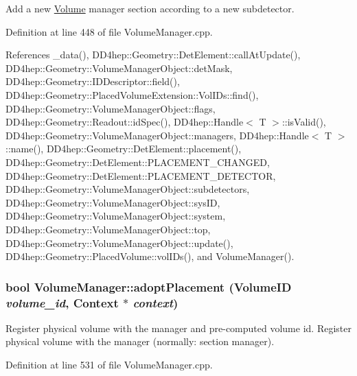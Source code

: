 Add a new \hyperlink{class_d_d4hep_1_1_geometry_1_1_volume}{Volume} manager section according to a new subdetector. 

Definition at line 448 of file VolumeManager.cpp.

References \_\-data(), DD4hep::Geometry::DetElement::callAtUpdate(), DD4hep::Geometry::VolumeManagerObject::detMask, DD4hep::Geometry::IDDescriptor::field(), DD4hep::Geometry::PlacedVolumeExtension::VolIDs::find(), DD4hep::Geometry::VolumeManagerObject::flags, DD4hep::Geometry::Readout::idSpec(), DD4hep::Handle$<$ T $>$::isValid(), DD4hep::Geometry::VolumeManagerObject::managers, DD4hep::Handle$<$ T $>$::name(), DD4hep::Geometry::DetElement::placement(), DD4hep::Geometry::DetElement::PLACEMENT\_\-CHANGED, DD4hep::Geometry::DetElement::PLACEMENT\_\-DETECTOR, DD4hep::Geometry::VolumeManagerObject::subdetectors, DD4hep::Geometry::VolumeManagerObject::sysID, DD4hep::Geometry::VolumeManagerObject::system, DD4hep::Geometry::VolumeManagerObject::top, DD4hep::Geometry::VolumeManagerObject::update(), DD4hep::Geometry::PlacedVolume::volIDs(), and VolumeManager().\hypertarget{class_d_d4hep_1_1_geometry_1_1_volume_manager_ac7ad07c472812b32144b3c2a8b4475b2}{
\subsubsection[{adoptPlacement}]{\setlength{\rightskip}{0pt plus 5cm}bool VolumeManager::adoptPlacement ({\bf VolumeID} {\em volume\_\-id}, \/  {\bf Context} $\ast$ {\em context})}}
\label{class_d_d4hep_1_1_geometry_1_1_volume_manager_ac7ad07c472812b32144b3c2a8b4475b2}


Register physical volume with the manager and pre-\/computed volume id. Register physical volume with the manager (normally: section manager). 

Definition at line 531 of file VolumeManager.cpp.

